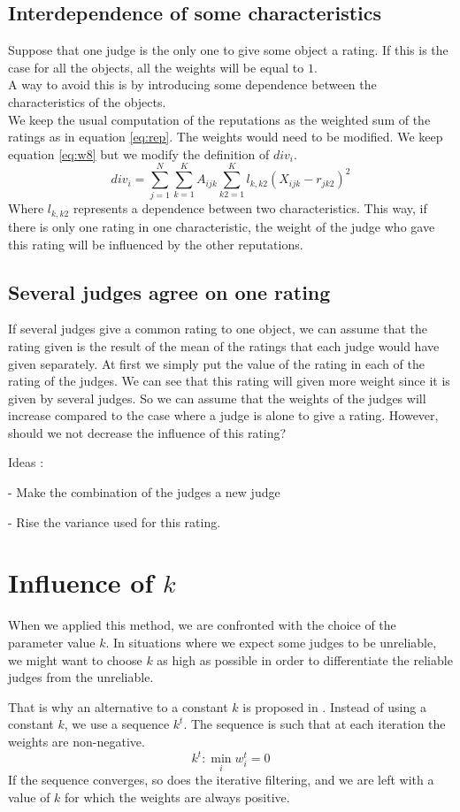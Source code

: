 \documentclass[12pt,a4paper]{article}
\begin{document}
\subsection{Interdependence of some characteristics}
Suppose that one judge is the only one to give some object a rating. If this is the case for all the objects, all the weights will be equal to $1$.\\
A way to avoid this is by introducing some dependence between the characteristics of the objects.\\
We keep the usual computation of the reputations as the weighted sum of the ratings as in equation \ref{eq:rep}. The weights would need to be modified. We keep equation \ref{eq:w8} but we modify the definition of $div_i$.
$$div_i = \sum_{j=1}^N \sum_{k=1}^K A_{ijk} \sum_{k2=1}^K l_{k,k2} (X_{ijk}-r_{jk2})^2$$
Where $l_{k,k2}$ represents a dependence between two characteristics. This way, if there is only one rating in one characteristic, the weight of the judge who gave this rating will be influenced by the other reputations.

\subsection{Several judges agree on one rating}
If several judges give a common rating to one object, we can assume that the rating given is the result of the mean of the ratings that each judge would have given separately. At first we simply put the value of the rating in each of the rating of the judges. We can see that this rating will given more weight since it is given by several judges. So we can assume that the weights of the judges will increase compared to the case where a judge is alone to give a rating. However, should we not decrease the influence of this rating?

Ideas :

- Make the combination of the judges a new judge

- Rise the variance used for this rating.
\section{Influence of $k$}
When we applied this method, we are confronted with the choice of the parameter value $k$. In situations where we expect some judges to be unreliable, we might want to choose $k$ as high as possible in order to differentiate the reliable judges from the unreliable.

That is why an alternative to a constant $k$ is proposed in \cite{Cristo1}. Instead of using a constant $k$, we use a sequence $k^t$. The sequence is such that at each iteration the weights are non-negative.
$$ k^t : \min_i w_i^t = 0$$
If the sequence converges, so does the iterative filtering, and we are left with a value of $k$ for which the weights are always positive.
\end{document}
